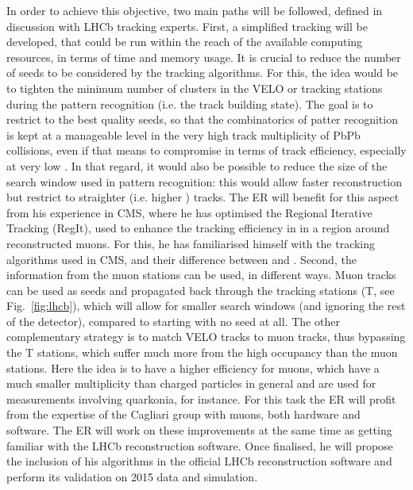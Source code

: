 \documentclass[a4paper,11pt]{article}
\newcommand{\ER}{ER\xspace}
\begin{document}
In order to achieve this objective, two main paths will be followed, defined in discussion with LHCb tracking experts.
First, a simplified tracking will be developed, that could be run within the reach of the available computing resources, in terms of time and memory usage. It is crucial to reduce the number of seeds to be considered by the tracking algorithms. For this, the idea would be to tighten the minimum number of clusters in 
the VELO or tracking stations during the pattern recognition (i.e. the track building state). 
The goal is to restrict to the best quality seeds, so that the combinatorics of patter recognition is kept at a manageable level in the very high track multiplicity of PbPb collisions, even if that means to compromise in terms of track efficiency, especially at very low \pt. In that regard, it would also be possible to reduce the size of the search window used in pattern recognition: this would allow faster reconstruction but restrict to straighter (i.e. higher \pt) tracks.
The \ER will benefit for this aspect from his experience in CMS, where he has optimised the Regional Iterative Tracking (RegIt), used to enhance the tracking efficiency in \pbpb in a region around reconstructed muons. For this, he has familiarised himself with the tracking algorithms used in CMS, and their difference between \pp and \pbpb.
%
Second, the information from the muon stations can be used, in different ways. Muon tracks can be used as seeds and propagated back through the tracking stations (T, see Fig.~\ref{fig:lhcb}), which will allow for smaller search windows (and ignoring the rest of the detector), compared to starting with no seed at all. The other complementary strategy is to match VELO tracks to muon tracks, thus bypassing the T stations, which suffer much more from the high occupancy than the muon stations. Here the idea is to have a higher efficiency for muons, which have a much smaller multiplicity than charged particles in general and are used for measurements involving quarkonia, for instance. For this task the \ER will profit from the expertise of the Cagliari group with muons, both hardware and software.
%
The \ER will work on these improvements at the same time as getting familiar with the LHCb reconstruction software. Once finalised, he will propose the inclusion of his algorithms in the official LHCb reconstruction software and perform its validation on 2015 \pbpb data and simulation.
\end{document}
